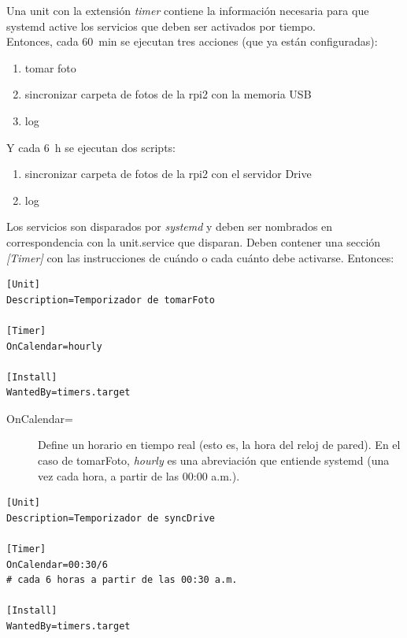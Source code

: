 \documentclass[10pt,a4paper]{article}
\newenvironment{unitFrame}[1][]{%
    \begin{mdframed}[%
        frametitle={#1},
        skipabove=\baselineskip plus 2pt minus 1pt,
        skipbelow=\baselineskip plus 2pt minus 1pt,
        linewidth=0.5pt,
        frametitlerule=true,
        frametitlebackgroundcolor=gray!10
    ]%
}{%
    \end{mdframed}
}
\begin{document}
Una unit con la extensi\'on \emph{timer} contiene la informaci\'on necesaria para que systemd active los servicios que deben ser activados por tiempo.\\

Entonces, cada \SI{60}{min} se ejecutan tres acciones (que ya est\'an configuradas):

\begin{enumerate}
    \item tomar foto
    \item sincronizar carpeta de fotos de la rpi2 con la memoria USB
    \item log
\end{enumerate}

Y cada \SI{6}{h} se ejecutan dos scripts:

\begin{enumerate}
    \item sincronizar carpeta de fotos de la rpi2 con el servidor Drive
    \item log
\end{enumerate}

Los servicios son disparados por \emph{systemd} y deben ser nombrados en correspondencia con la unit.service que disparan. Deben contener una secci\'on \emph{[Timer]} con las instrucciones de cu\'ando o cada cu\'anto debe activarse. Entonces:

\begin{scriptsize}
\begin{unitFrame}[/etc/systemd/system/tomarFoto.timer]
\begin{verbatim}
[Unit]
Description=Temporizador de tomarFoto

[Timer]
OnCalendar=hourly

[Install]
WantedBy=timers.target
\end{verbatim}
\end{unitFrame}
\end{scriptsize}

\begin{description}
    \item [OnCalendar=] Define un horario en tiempo real (esto es, la hora del reloj de pared). En el caso de tomarFoto, \emph{hourly} es una abreviaci\'on que entiende systemd (una vez cada hora, a partir de las 00:00 a.m.).
\end{description}

\begin{scriptsize}
\begin{unitFrame}[/etc/systemd/system/syncDrive.timer]
\begin{verbatim}
[Unit]
Description=Temporizador de syncDrive

[Timer]
OnCalendar=00:30/6
# cada 6 horas a partir de las 00:30 a.m.

[Install]
WantedBy=timers.target
\end{verbatim}
\end{unitFrame}
\end{scriptsize}
\end{document}
